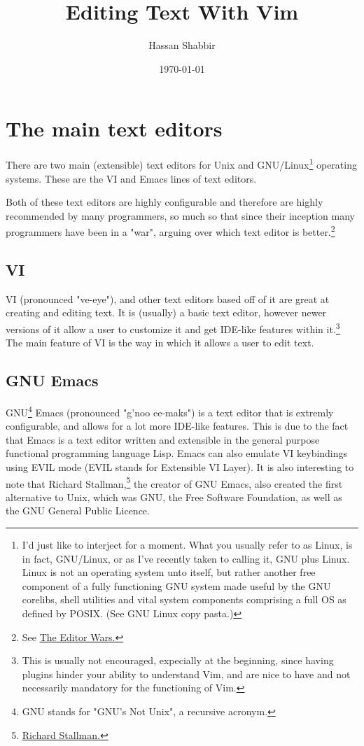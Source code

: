 \documentclass[11pt]{article}
\author{Hassan Shabbir}
\date{\today}
\title{Editing Text With Vim}
\begin{document}
\maketitle
\tableofcontents

\newpage

\section{The main text editors}
\label{sec:org6a459f8}
There are two main (extensible) text editors for Unix and GNU/Linux\footnote{I'd just like to interject for a moment. What you usually refer to as Linux, is
in fact, GNU/Linux, or as I've recently taken to calling it, GNU plus Linux.
Linux is not an operating system unto itself, but rather another free component
of a fully functioning GNU system made useful by the GNU corelibs, shell
utilities and vital system components comprising a full OS as defined by POSIX.
(See GNU Linux copy pasta.)}
operating systems. These are the VI and Emacs lines of text editors.

Both of these text editors are highly configurable and therefore are highly
recommended by many programmers, so much so that since their inception many
programmers have been in a "war", arguing over which text editor is
better.\footnote{See \href{https://en.wikipedia.org/wiki/Editor\_war}{The Editor Wars.}}
\subsection{VI}
\label{sec:orgf661ef0}
VI (pronounced "ve-eye"), and other text editors based off of it are great at
creating and editing text. It is (usually) a basic text editor, however newer
versions of it allow a user to customize it and get IDE-like features within
it.\footnote{This is usually not encouraged, expecially at the beginning, since
having plugins hinder your ability to understand Vim, and are nice to have and
not necessarily mandatory for the functioning of Vim.} The main feature of VI is the way in which it allows a user to edit
text.
\subsection{GNU Emacs}
\label{sec:org7655449}
GNU\footnote{GNU stands for "GNU's Not Unix", a recursive acronym.} Emacs (pronounced "g'noo ee-maks") is a text editor that is extremly
configurable, and allows for a lot more IDE-like features. This is due to the
fact that Emacs is a text editor written and extensible in the general purpose
functional programming language Lisp. Emacs can also emulate VI keybindings
using EVIL mode (EVIL stands for Extensible VI Layer). It is also interesting to
note that Richard Stallman,\footnote{\href{https://en.wikipedia.org/wiki/Richard\_Stallman}{Richard Stallman.}} the creator of GNU Emacs, also created the
first alternative to Unix, which was GNU, the Free Software Foundation, as well
as the GNU General Public Licence.
\end{document}
